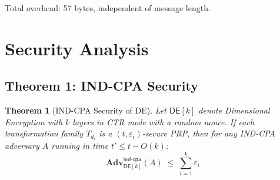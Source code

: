 \documentclass[11pt]{article}
\newtheorem{theorem}{Theorem}
\newcommand{\DE}{\textsf{DE}}
\newcommand{\Adv}{\mathbf{Adv}}
\begin{document}
Total overhead: 57 bytes, independent of message length.

\section{Security Analysis}
\label{sec:security}

\subsection{Theorem 1: IND-CPA Security}

\begin{theorem}[IND-CPA Security of \DE]
\label{thm:indcpa}
Let $\DE[k]$ denote Dimensional Encryption with $k$ layers in CTR mode
with a random nonce. If each transformation family $T_{d_i}$ is a
$(t, \varepsilon_i)$-secure PRP, then for any IND-CPA adversary $A$
running in time $t' \leq t - O(k)$:
\[
\Adv^{\textsf{ind-cpa}}_{\DE[k]}(A) \;\leq\; \sum_{i=1}^{k} \varepsilon_i
\]
\end{theorem}
\end{document}
